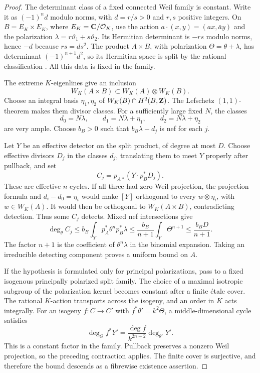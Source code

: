 \begin{proof}
The determinant class of a fixed connected Weil family is constant. Write it as $(-1)^n d$ modulo norms, with $d=r/s>0$ and $r,s$ positive integers. On $B=E_K\times E_K$, where $E_K=\mathbf C/\mathcal O_K$, use the action $a\cdot(x,y)=(ax,\bar a y)$ and the polarization $\lambda=r\vartheta_1+s\vartheta_2$. Its Hermitian determinant is $-rs$ modulo norms, hence $-d$ because $rs=d s^2$. The product $A\times B$, with polarization $\Theta=\theta+\lambda$, has determinant $(-1)^{n+1}d^2$, so its Hermitian space is split by the rational classification \cite[Proposition~4.1 and Corollary~4.2]{Deligne82}. All this data is fixed in the family.

The extreme $K$-eigenlines give an inclusion
\[
 W_K(A\times B)\subset W_K(A)\otimes W_K(B).
\]
Choose an integral basis $\eta_1,\eta_2$ of $W_K(B)\cap H^2(B,\mathbf Z)$. The Lefschetz $(1,1)$-theorem makes them divisor classes. For a sufficiently large fixed $N$, the classes
\[
 d_0=N\lambda,\qquad d_1=N\lambda+\eta_1,
 \qquad d_2=N\lambda+\eta_2
\]
are very ample. Choose $b_B>0$ such that $b_B\lambda-d_j$ is nef for each $j$.

Let $Y$ be an effective detector on the split product, of degree at most $D$. Choose effective divisors $D_j$ in the classes $d_j$, translating them to meet $Y$ properly after pullback, and set
\[
 C_j=p_{A*}(Y\cdot p_B^*D_j).
\]
These are effective $n$-cycles. If all three had zero Weil projection, the projection formula and $d_i-d_0=\eta_i$ would make $[Y]$ orthogonal to every $w\otimes\eta_i$, with $w\in W_K(A)$. It would then be orthogonal to $W_K(A\times B)$, contradicting detection. Thus some $C_j$ detects. Mixed nef intersections give
\[
 \deg_\theta C_j
 \leq b_B\int_Yp_A^*\theta^n p_B^*\lambda
 \leq\frac{b_B}{n+1}\int_Y\Theta^{n+1}
 \leq\frac{b_BD}{n+1}.
\]
The factor $n+1$ is the coefficient of $\theta^n\lambda$ in the binomial expansion. Taking an irreducible detecting component proves a uniform bound on $A$.

If the hypothesis is formulated only for principal polarizations, pass to a fixed isogenous principally polarized split family. The choice of a maximal isotropic subgroup of the polarization kernel becomes constant after a finite \'etale cover. The rational $K$-action transports across the isogeny, and an order in $K$ acts integrally. For an isogeny $f:C\to C'$ with $f^*\theta'=k^2\Theta$, a middle-dimensional cycle satisfies
\[
 \deg_\Theta f^*Y'
 =\frac{\deg f}{k^{2n+2}}\deg_{\theta'}Y'.
\]
This is a constant factor in the family. Pullback preserves a nonzero Weil projection, so the preceding contraction applies. The finite cover is surjective, and therefore the bound descends as a fibrewise existence assertion.
\end{proof}

